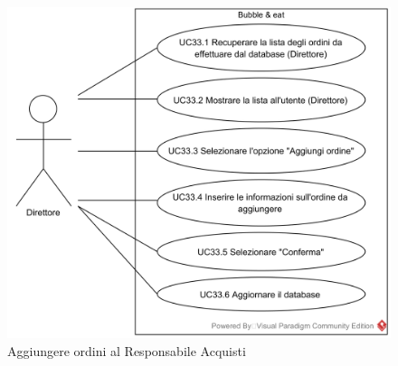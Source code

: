 
\begin{figure}[H]
	\centering
	\includegraphics[width=15cm]{../../documenti/AnalisiDeiRequisiti/Diagrammi_img/usecase/uc3_14.png}
	\caption{\UCCaption{} Aggiungere ordini al Responsabile Acquisti}
\end{figure}


